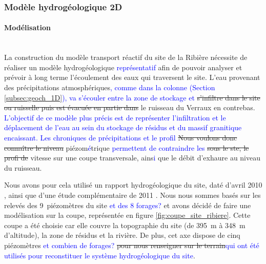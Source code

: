 \documentclass{article}
\newcommand{\blue}[1]{\textcolor{blue}{#1}} %
\begin{document}
\subsubsection{Modèle hydrogéologique 2D}
\paragraph{Modélisation \\ \\}
La construction du modèle transport réactif du site de la Ribière nécessite de réaliser un modèle hydrogéologique \blue{représentatif} afin de pouvoir analyser et prévoir à long terme l'écoulement des eaux qui traversent le site. 
L'eau provenant des précipitations atmosphériques\blue{, comme dans la colonne (Section \ref{subsec:geoch_1D}), va s'écouler entre la zone de stockage et} \sout{s'infiltre dans le site ou ruisselle puis est évacuée en partie dans} le ruisseau du Verraux en contrebas. \blue{L'objectif de ce modèle plus précis est de représenter l'infiltration et le déplacement de l'eau au sein du stockage de résidus et du massif granitique encaissant. Les chroniques de précipitations et le profil} \sout{Nous voulons donc connaître le niveau} piézom\blue{é}trique \blue{permettent de contraindre les} \sout{sous le ste, le profi de} vitesse sur une coupe transversale, ains\blue{i} que le débit d'exhaure au niveau du ruisseau.

Nous avons pour cela utilisé un rapport hydrogéologique du site, daté d'avril 2010 \cite{societe_areva_nc_etude_2010}, ainsi que d'une étude complémentaire de 2011 \cite{societe_areva_nc_etude_2011}. Nous nous sommes basés sur les relevés des 9~piézomètres du site \blue{et des 8 forages?} et avons décidé de faire une modélisation sur la coupe,  représentée en figure \ref{fig:coupe_site_ribiere}.
Cette coupe a été choisie car elle couvre la topographie du site (de 395~m à 348~m d'altitude), la zone de résidus et la rivière. De plus, cet axe dispose de cinq piézomètres \blue{et combien de forages?} \sout{pour nous renseigner sur le terrain}\blue{qui ont été utilisés pour reconstituer le système hydrogéologique du site}.


\end{document}

